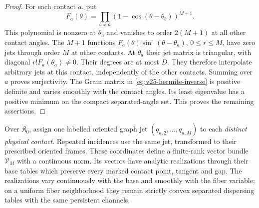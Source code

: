 \begin{proof}
For each contact \(a\), put
\[
 F_a(\theta)=\prod_{b\ne a}(1-\cos(\theta-\theta_b))^{M+1}.
\]
This polynomial is nonzero at \(\theta_a\) and vanishes to order
\(2(M+1)\) at all other contact angles.  The \(M+1\) functions
\(F_a(\theta)\sin^r(\theta-\theta_a)\), \(0\le r\le M\), have
zero jets through order \(M\) at other contacts.  At \(\theta_a\) their
jet matrix is triangular, with diagonal \(r!F_a(\theta_a)\ne0\).
Their degrees are at most \(D\).  They therefore interpolate arbitrary
jets at this contact, independently of the other contacts.  Summing over
\(a\) proves surjectivity.  The Gram matrix in
\eqref{eq:v25-hermite-inverse} is positive definite and varies smoothly with
the contact angles.  Its least eigenvalue has a positive minimum on the
compact separated-angle set.  This proves the remaining assertions.
\end{proof}

\begin{proposition}
\label{prop:v25-analytic-jet-bundle}
Over \(\mathfrak K_0\), assign one labelled oriented graph jet
\((q_{a,2},\ldots,q_{a,M})\) to each \emph{distinct physical contact}.
Repeated incidences use the same jet, transformed to their prescribed
oriented frames.  These coordinates define a finite-rank vector bundle
\(\mathcal V_M\) with a continuous norm.  Its vectors have analytic
realizations through their base tables which preserve every marked contact
point, tangent and gap.  The realizations vary continuously with the base
and smoothly with the fiber variable; on a uniform fiber neighborhood they
remain strictly convex separated dispersing tables with the same persistent
channels.
\end{proposition}

